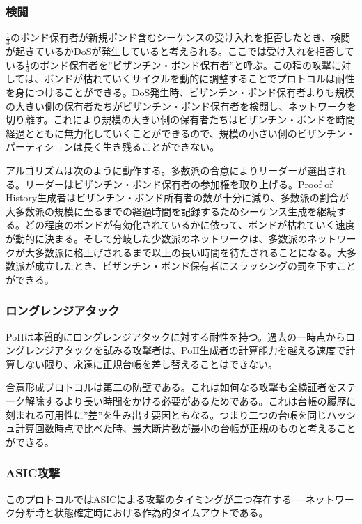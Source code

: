 \documentclass[12pt]{ltjsarticle}
\begin{document}
\subsubsection{検閲}\label{censorship}
\(\frac{1}{3}\)のボンド保有者が新規ボンド含むシーケンスの受け入れを拒否したとき、検閲が起きているかDoSが発生していると考えられる。ここでは受け入れを拒否している\(\frac{1}{3}\)のボンド保有者を”ビザンチン・ボンド保有者”と呼ぶ。この種の攻撃に対しては、ボンドが枯れていくサイクルを動的に調整することでプロトコルは耐性を身につけることができる。DoS発生時、ビザンチン・ボンド保有者よりも規模の大きい側の保有者たちがビザンチン・ボンド保有者を検閲し、ネットワークを切り離す。これにより規模の大きい側の保有者たちはビザンチン・ボンドを時間経過とともに無力化していくことができるので、規模の小さい側のビザンチン・パーティションは長く生き残ることができない。

アルゴリズムは次のように動作する。多数派の合意によりリーダーが選出される。リーダーはビザンチン・ボンド保有者の参加権を取り上げる。Proof of History生成者はビザンチン・ボンド所有者の数が十分に減り、多数派の割合が大多数派の規模に至るまでの経過時間を記録するためシーケンス生成を継続する。どの程度のボンドが有効化されているかに依って、ボンドが枯れていく速度が動的に決まる。そして分岐した少数派のネットワークは、多数派のネットワークが大多数派に格上げされるまで以上の長い時間を待たされることになる。大多数派が成立したとき、ビザンチン・ボンド保有者にスラッシングの罰を下すことができる。

\subsubsection{ロングレンジアタック}
PoHは本質的にロングレンジアタックに対する耐性を持つ。過去の一時点からロングレンジアタックを試みる攻撃者は、PoH生成者の計算能力を越える速度で計算しない限り、永遠に正規台帳を差し替えることはできない。

合意形成プロトコルは第二の防壁である。これは如何なる攻撃も全検証者をステーク解除するより長い時間をかける必要があるためである。これは台帳の履歴に刻まれる可用性に”差”を生み出す要因ともなる。つまり二つの台帳を同じハッシュ計算回数時点で比べた時、最大断片数が最小の台帳が正規のものと考えることができる。

\subsubsection{ASIC攻撃}

このプロトコルではASICによる攻撃のタイミングが二つ存在する──ネットワーク分断時と状態確定時における作為的タイムアウトである。
\end{document}
